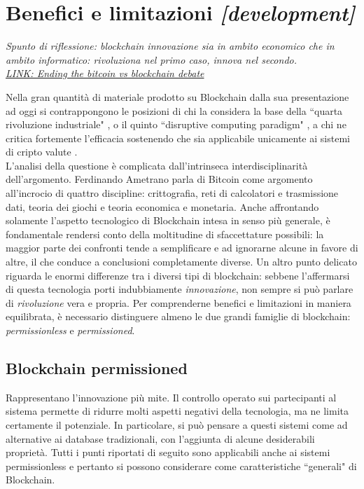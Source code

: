 \section{Benefici e limitazioni \emph{[development]}}
	\emph{Spunto di riflessione: blockchain innovazione sia in ambito economico che in ambito informatico: rivoluziona nel primo caso, innova nel secondo. \\
	\href{https://www.linkedin.com/pulse/ending-bitcoin-vs-blockchain-debate-gideon-greenspan}{LINK: Ending the bitcoin vs blockchain debate}}
	
	Nella gran quantità di materiale prodotto su Blockchain dalla sua presentazione ad oggi si contrappongono le posizioni di chi la considera la base della ``quarta rivoluzione industriale" \cite{4industrialrevo}, o il quinto ``disruptive computing paradigm" \cite{blockchain_swan}, a chi ne critica fortemente l'efficacia sostenendo che sia applicabile unicamente ai sistemi di cripto valute \cite{what_is_it_good_for}. \\
	L'analisi della questione è complicata dall'intrinseca interdisciplinarità dell'argomento. Ferdinando Ametrano parla di Bitcoin \cite{Ametrano_slides} come argomento all'incrocio di quattro discipline: crittografia, reti di calcolatori e trasmissione dati, teoria dei giochi e teoria economica e monetaria. Anche affrontando solamente l'aspetto tecnologico di Blockchain intesa in senso più generale, è fondamentale rendersi conto della moltitudine di sfaccettature possibili: la maggior parte dei confronti tende a semplificare e ad ignorarne alcune in favore di altre, il che conduce a conclusioni completamente diverse. Un altro punto delicato riguarda le enormi differenze tra i diversi tipi di blockchain: sebbene l'affermarsi di questa tecnologia porti indubbiamente \emph{innovazione}, non sempre si può parlare di \emph{rivoluzione} vera e propria. Per comprenderne benefici e limitazioni in maniera equilibrata, è necessario distinguere almeno le due grandi famiglie di blockchain: \emph{permissionless} e \emph{permissioned}.
	\subsection{Blockchain permissioned}
		Rappresentano l'innovazione più mite. Il controllo operato sui partecipanti al sistema permette di ridurre molti aspetti negativi della tecnologia, ma ne limita certamente il potenziale. In particolare, si può pensare a questi sistemi come ad alternative ai database tradizionali, con l'aggiunta di alcune desiderabili proprietà. Tutti i punti riportati di seguito sono applicabili anche ai sistemi permissionless e pertanto si possono considerare come caratteristiche ``generali" di Blockchain.
